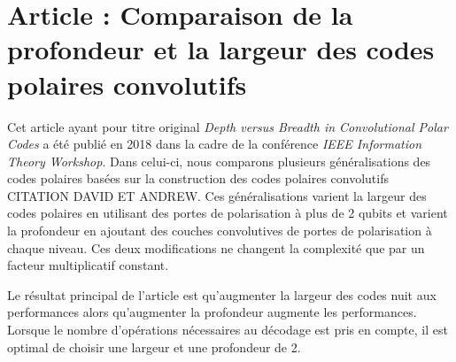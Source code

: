 \section{Article : Comparaison de la profondeur et la largeur des codes polaires convolutifs}

Cet article ayant pour titre original \textit{Depth versus Breadth in Convolutional Polar Codes}
a été publié en 2018 dans la cadre de la conférence \textit{IEEE Information Theory Workshop}.
Dans celui-ci,
nous comparons plusieurs généralisations des codes polaires basées sur la construction 
des codes polaires convolutifs CITATION DAVID ET ANDREW.
Ces généralisations varient la largeur des codes polaires en utilisant des portes 
de polarisation à plus de 2 qubits 
et varient la profondeur en ajoutant des couches convolutives 
de portes de polarisation à chaque niveau.
Ces deux modifications ne changent la complexité que par un facteur multiplicatif constant.

Le résultat principal de l'article est qu'augmenter la largeur des codes 
nuit aux performances alors qu'augmenter la profondeur augmente les performances.
Lorsque le nombre d'opérations nécessaires au décodage est pris en compte,
il est optimal de choisir une largeur et une profondeur de 2.




